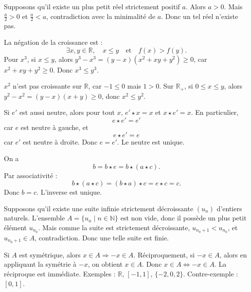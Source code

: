 \documentclass[11pt,a4paper]{article}
\newcommand{\N}{\mathbb{N}}
\newcommand{\R}{\mathbb{R}}
\newcommand{\imp}{\Rightarrow}
\newcommand{\ssi}{\Longleftrightarrow}
\begin{document}
\begin{correctionbox}[PREP 40]
Supposons qu'il existe un plus petit réel strictement positif \(a\). Alors \(a>0\). Mais \(\frac a2>0\) et \(\frac a2<a\), contradiction avec la minimalité de \(a\). Donc un tel réel n'existe pas.
\end{correctionbox}

\begin{correctionbox}[ORAUX 41]
La négation de la croissance est :
\[
\exists x,y\in\R,\quad x\leq y\quad\text{et}\quad f(x)>f(y).
\]
Pour \(x^3\), si \(x\leq y\), alors \(y^3-x^3=(y-x)(x^2+xy+y^2)\geq0\), car \(x^2+xy+y^2\geq0\). Donc \(x^3\leq y^3\).

\(x^2\) n'est pas croissante sur \(\R\), car \(-1\leq0\) mais \(1>0\). Sur \(\R_+\), si \(0\leq x\leq y\), alors \(y^2-x^2=(y-x)(x+y)\geq0\), donc \(x^2\leq y^2\).
\end{correctionbox}

\begin{correctionbox}[ORAUX 42]
Si \(e'\) est aussi neutre, alors pour tout \(x\), \(e'\star x=x\) et \(x\star e'=x\). En particulier,
\[
e\star e'=e'
\]
car \(e\) est neutre à gauche, et
\[
e\star e'=e
\]
car \(e'\) est neutre à droite. Donc \(e=e'\). Le neutre est unique.
\end{correctionbox}

\begin{correctionbox}[ORAUX 43]
On a
\[
b=b\star e=b\star(a\star c).
\]
Par associativité :
\[
b\star(a\star c)=(b\star a)\star c=e\star c=c.
\]
Donc \(b=c\). L'inverse est unique.
\end{correctionbox}

\begin{correctionbox}[ORAUX 44]
Supposons qu'il existe une suite infinie strictement décroissante \((u_n)\) d'entiers naturels. L'ensemble \(A=\{u_n\mid n\in\N\}\) est non vide, donc il possède un plus petit élément \(u_{n_0}\). Mais comme la suite est strictement décroissante, \(u_{n_0+1}<u_{n_0}\), et \(u_{n_0+1}\in A\), contradiction. Donc une telle suite est finie.
\end{correctionbox}

\begin{correctionbox}[ORAUX 45]
Si \(A\) est symétrique, alors \(x\in A\imp -x\in A\). Réciproquement, si \(-x\in A\), alors en appliquant la symétrie à \(-x\), on obtient \(x\in A\). Donc \(x\in A\ssi -x\in A\). La réciproque est immédiate. Exemples : \(\R\), \([-1,1]\), \(\{-2,0,2\}\). Contre-exemple : \([0,1]\).
\end{correctionbox}
\end{document}
